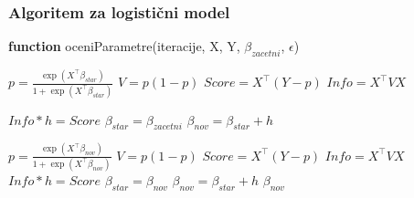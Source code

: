 \documentclass[12pt,a4paper]{amsart}
\theoremstyle{definition} %
\theoremstyle{plain} %
\begin{document}
\subsubsection{Algoritem za logistični model}

%    
\begin{algorithm}[H]
    \caption{\textbf{function} oceniParametre(iteracije, X, Y, $\beta_{zacetni}$, $\epsilon$)}
\begin{algorithmic}
    
    \STATE $p = \frac{\exp{(X^\top \beta_{star})}}{1 + \exp{(X^\top \beta_{star})}}$
    \STATE $V = p(1 - p)$ 
    \STATE $Score = X^\top (Y - p)$ 
    \STATE $Info = X^\top V X$ 
    
    \STATE {} $Info * h = Score$
    \STATE $\beta_{star} = \beta_{zacetni}$
    \STATE $\beta_{nov} = \beta_{star} + h$
        
            \STATE $p = \frac{\exp{(X^\top \beta_{nov})}}{1 + \exp{(X^\top \beta_{nov})}}$ 
            \STATE $V = p(1 - p)$ 
            \STATE $Score = X^\top (Y - p)$ 
            \STATE $Info = X^\top V X$ 
            \STATE {}
            \STATE $Info * h = Score$ 
            \STATE $\beta_{star} = \beta_{nov}$ 
            \STATE $\beta_{nov} = \beta_{star} + h$ 
        \ELSE
        \STATE {}
        \RETURN $\beta_{nov}$
        \ENDIF
        
    \ENDWHILE
\end{algorithmic}

\end{algorithm}
\end{document}
